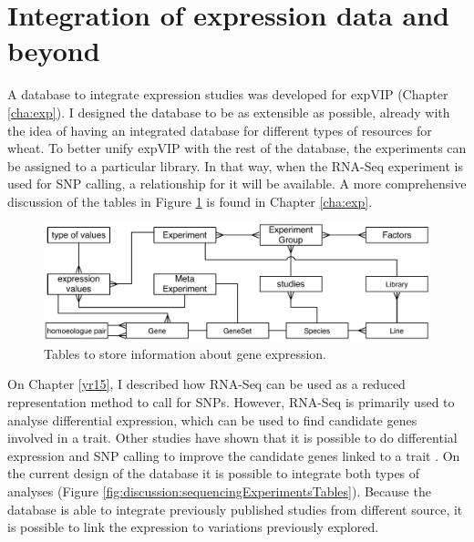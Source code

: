 \pagebreak
\section{Integration of expression data and beyond}

A database to integrate expression studies was developed for expVIP (Chapter \ref{cha:exp}). 
I designed the database to be as extensible as possible, already with the idea of having an integrated database for different types of resources for wheat. 
To better unify expVIP with the rest of the database, the experiments can be assigned to a particular library. 
In that way, when the RNA-Seq experiment is used for SNP calling, a relationship for it will be available. 
A more comprehensive discussion of the tables in Figure \ref{fig:discussion:expressionTables} is found in Chapter \ref{cha:exp}. 

\begin{figure}[b]
\includegraphics[width=1\textwidth]{Conclusions/Figures/ExpressionTables.pdf}
\caption{Tables to store information about gene expression.}
\label{fig:discussion:expressionTables}
\end{figure}

On Chapter \ref{yr15}, I described how RNA-Seq can be used as a reduced representation method to call for SNPs. 
However, RNA-Seq is primarily used to analyse differential expression, which can be used to find candidate genes involved in a trait.
Other studies have shown that it is possible to do differential expression and SNP calling to improve the candidate genes linked to a trait \citep{Lopez-Maestre2016}.
On the current design of the database it is possible to integrate both types of analyses (Figure \ref{fig:discussion:sequencingExperimentsTables}). 
Because the database is able to integrate previously published studies from different source, it is possible to link the expression to variations previously explored. 


